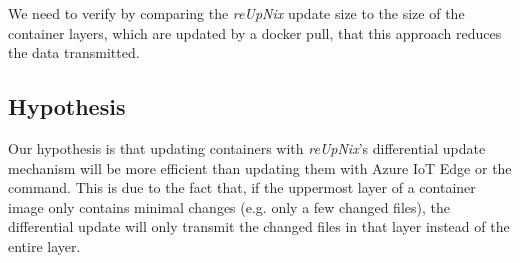 We need to verify by comparing the \textit{reUpNix} update size to the size of the container layers,
which are updated by a docker pull, that this approach reduces the data transmitted.

\subsection{Hypothesis}
Our hypothesis is that updating containers with \textit{reUpNix}'s differential
update mechanism will be more efficient than updating them with Azure IoT Edge or
the  command. This is due to the fact that, if the uppermost
layer of a container image only contains minimal changes (e.g. only a few
changed files), the differential update will only transmit the changed files in
that layer instead of the entire layer.
